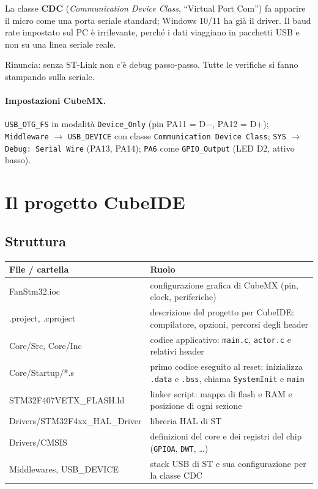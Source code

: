 \documentclass[11pt,a4paper]{article}
\newcommand{\code}[1]{\texttt{\small #1}}
\begin{document}
La classe \textbf{CDC} (\emph{Communication Device Class}, ``Virtual Port Com'') fa apparire il micro
come una porta seriale standard; Windows 10/11 ha già il driver. Il baud rate impostato sul PC è
irrilevante, perché i dati viaggiano in pacchetti USB e non su una linea seriale reale.

Rinuncia: senza ST-Link non c'è debug passo-passo. Tutte le verifiche si fanno stampando sulla seriale.

\paragraph{Impostazioni CubeMX.}
\code{USB\_OTG\_FS} in modalità \code{Device\_Only} (pin PA11 = D$-$, PA12 = D$+$);
\code{Middleware} $\to$ \code{USB\_DEVICE} con classe \code{Communication Device Class};
\code{SYS} $\to$ \code{Debug: Serial Wire} (PA13, PA14);
\code{PA6} come \code{GPIO\_Output} (LED D2, attivo basso).

\section{Il progetto CubeIDE}

\subsection{Struttura}
\begin{center}
\small
\begin{tabularx}{\textwidth}{@{}>{\ttfamily}lX@{}}
\toprule
\normalfont\bfseries File / cartella & \bfseries Ruolo\\
\midrule
FanStm32.ioc & configurazione grafica di CubeMX (pin, clock, periferiche)\\
.project, .cproject & descrizione del progetto per CubeIDE: compilatore, opzioni, percorsi degli header\\
Core/Src, Core/Inc & codice applicativo: \code{main.c}, \code{actor.c} e relativi header\\
Core/Startup/*.s & primo codice eseguito al reset: inizializza \code{.data} e \code{.bss}, chiama \code{SystemInit} e \code{main}\\
STM32F407VETX\_FLASH.ld & linker script: mappa di flash e RAM e posizione di ogni sezione\\
Drivers/STM32F4xx\_HAL\_Driver & libreria HAL di ST\\
Drivers/CMSIS & definizioni del core e dei registri del chip (\code{GPIOA}, \code{DWT}, \dots)\\
Middlewares, USB\_DEVICE & stack USB di ST e sua configurazione per la classe CDC\\
\bottomrule
\end{tabularx}
\end{center}
\end{document}
